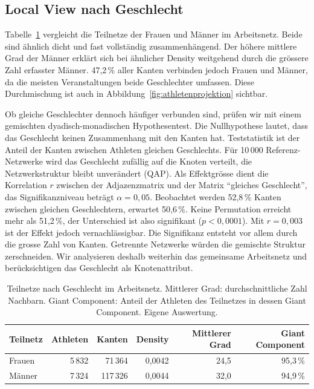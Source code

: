 \subsection{Local View nach Geschlecht}
Tabelle~\ref{tab:local} vergleicht die Teilnetze der Frauen und Männer im
Arbeitsnetz. Beide sind ähnlich dicht und fast vollständig zusammenhängend.
Der höhere mittlere Grad der Männer erklärt sich bei ähnlicher Density
weitgehend durch die grössere Zahl erfasster Männer. 47,2\,\% aller Kanten
verbinden jedoch Frauen und Männer, da die meisten Veranstaltungen beide
Geschlechter umfassen. Diese Durchmischung ist auch in
Abbildung~\ref{fig:athletenprojektion} sichtbar.

Ob gleiche Geschlechter dennoch häufiger verbunden sind, prüfen wir mit
einem gemischten dyadisch-monadischen Hypothesentest. Die Nullhypothese lautet, dass das
Geschlecht keinen Zusammenhang mit den Kanten hat. Teststatistik ist der
Anteil der Kanten zwischen Athleten gleichen Geschlechts. Für 10\,000
Referenz-Netzwerke wird das Geschlecht zufällig auf die Knoten verteilt,
die Netzwerkstruktur bleibt unverändert (QAP). Als Effektgrösse dient die
Korrelation $r$ zwischen der Adjazenzmatrix und der Matrix
\enquote{gleiches Geschlecht}, das Signifikanzniveau beträgt
$\alpha = 0{,}05$. Beobachtet werden 52,8\,\% Kanten zwischen gleichen
Geschlechtern, erwartet 50,6\,\%. Keine Permutation erreicht mehr als
51,2\,\%, der Unterschied ist also signifikant ($p < 0{,}0001$). Mit
$r = 0{,}003$ ist der Effekt jedoch vernachlässigbar. Die Signifikanz
entsteht vor allem durch die grosse Zahl von Kanten. Getrennte Netzwerke
würden die gemischte Struktur zerschneiden. Wir analysieren deshalb
weiterhin das gemeinsame Arbeitsnetz und berücksichtigen das Geschlecht als
Knotenattribut.

\begin{table}[H]
  \centering
  \caption{Teilnetze nach Geschlecht im Arbeitsnetz. Mittlerer Grad:
  durchschnittliche Zahl Nachbarn. Giant Component: Anteil der Athleten des
  Teilnetzes in dessen Giant Component. Eigene Auswertung.}
  \label{tab:local}
  \begin{tabular}{@{}lrrrrr@{}}
    \toprule
    Teilnetz & Athleten & Kanten & Density & Mittlerer Grad & Giant Component \\
    \midrule
    Frauen & 5\,832 & 71\,364 & 0,0042 & 24,5 & 95,3\,\% \\
    Männer & 7\,324 & 117\,326 & 0,0044 & 32,0 & 94,9\,\% \\
    \bottomrule
  \end{tabular}
\end{table}

